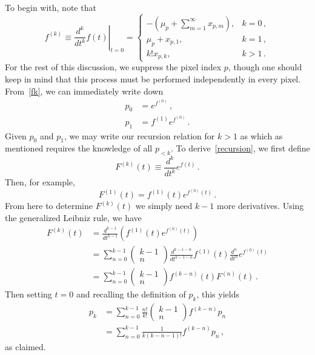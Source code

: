 To begin with, note that
\begin{equation}
f^{(k)} \equiv \left. \frac{d^k}{dt^k} f(t) \right|_{t=0} = \left\{ \begin{array}{lc} -(\mu_p + \sum_{m=1}^{\infty} x_{p,m}), & k=0\,, \\ \mu_p + x_{p,1}, & k=1\,, \\ k! x_{p,k}, & k > 1\,. \end{array} \right.
\label{fk}
\end{equation}
For the rest of this discussion, we suppress the pixel index $p$, though one should keep in mind that this process must be performed independently in every pixel.
From~\eqref{fk}, we can immediately write down
\begin{equation}\begin{aligned}
p_0 &= e^{f^{(0)}}\,, \\
p_1 &= f^{(1)} e^{f^{(0)}}\,.
\end{aligned}\end{equation}
Given $p_0$ and $p_1$, we may write our recursion relation for $k > 1$ as
which as mentioned requires the knowledge of all $p_{< k}$. 
To derive~\eqref{recursion}, we first define
\begin{equation}
F^{(k)}(t) \equiv \frac{d^k}{dt^k} e^{f(t)}\,.
\end{equation}
Then, for example,
\begin{equation}
F^{(1)}(t) = f^{(1)}(t) e^{f^{(0)}(t)}\,.
\end{equation}
From here to determine $F^{(k)}(t)$ we simply need $k-1$ more derivatives. Using the generalized Leibniz rule, we have
\begin{equation}\begin{aligned}
F^{(k)}(t) &= \frac{d^{k-1}}{dt^{k-1}} \left( f^{(1)}(t) e^{f^{(0)}(t)} \right) \\
&= \sum_{n=0}^{k-1} \begin{pmatrix} k-1 \\ n \end{pmatrix} \frac{d^{k-1-n}}{dt^{k-1-n}} f^{(1)}(t) \frac{d^n}{dt^n} e^{f^{(0)}(t)} \\
&= \sum_{n=0}^{k-1} \begin{pmatrix} k-1 \\ n \end{pmatrix} f^{(k-n)}(t) F^{(n)}(t)\,.
\end{aligned}\end{equation}
Then setting $t=0$ and recalling the definition of $p_k$, this yields
\begin{equation}\begin{aligned}
p_k &= \sum_{n=0}^{k-1} \frac{n!}{k!} \begin{pmatrix} k-1 \\ n \end{pmatrix} f^{(k-n)} p_n \\
&= \sum_{n=0}^{k-1} \frac{1}{k(k-n-1)!} f^{(k-n)} p_n\,,
\end{aligned}\end{equation}
as claimed.

